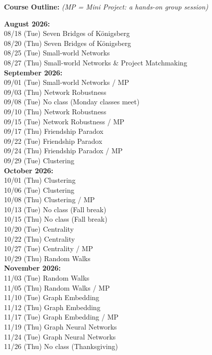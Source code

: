 \documentclass[11pt, a4paper]{article}
\begin{document}
\noindent \textbf{Course Outline:} \textit{(MP = Mini Project: a hands-on group session)}
\begin{center}
\begin{minipage}{5in}
\begin{flushleft}
\textbf{August 2026:} \\
08/18 (Tue) \dotfill Seven Bridges of K\"onigsberg \\
08/20 (Thu) \dotfill Seven Bridges of K\"onigsberg \\
08/25 (Tue) \dotfill Small-world Networks \\
08/27 (Thu) \dotfill Small-world Networks \& Project Matchmaking\\

\textbf{September 2026:} \\
09/01 (Tue) \dotfill Small-world Networks / MP \\
09/03 (Thu) \dotfill Network Robustness \\
09/08 (Tue) \dotfill No class (Monday classes meet) \\
09/10 (Thu) \dotfill Network Robustness \\
09/15 (Tue) \dotfill Network Robustness / MP \\
09/17 (Thu) \dotfill Friendship Paradox \\
09/22 (Tue) \dotfill Friendship Paradox \\
09/24 (Thu) \dotfill Friendship Paradox / MP \\
09/29 (Tue) \dotfill Clustering \\

\textbf{October 2026:} \\
10/01 (Thu) \dotfill Clustering \\
10/06 (Tue) \dotfill Clustering \\
10/08 (Thu) \dotfill Clustering / MP \\
10/13 (Tue) \dotfill No class (Fall break) \\
10/15 (Thu) \dotfill No class (Fall break) \\
10/20 (Tue) \dotfill Centrality \\
10/22 (Thu) \dotfill Centrality \\
10/27 (Tue) \dotfill Centrality / MP \\
10/29 (Thu) \dotfill Random Walks \\

\textbf{November 2026:} \\
11/03 (Tue) \dotfill Random Walks \\
11/05 (Thu) \dotfill Random Walks / MP \\
11/10 (Tue) \dotfill Graph Embedding \\
11/12 (Thu) \dotfill Graph Embedding \\
11/17 (Tue) \dotfill Graph Embedding / MP \\
11/19 (Thu) \dotfill Graph Neural Networks \\
11/24 (Tue) \dotfill Graph Neural Networks \\
11/26 (Thu) \dotfill No class (Thanksgiving) \\


\end{flushleft}
\end{minipage}
\end{center}
\end{document}
